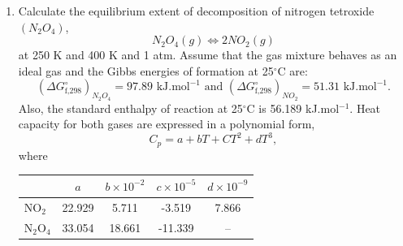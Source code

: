 \documentclass[12pts,a4paper,amsmath,amssymb,floatfix]{article}%
\newcounter{reaction}
\begin{document}
\begin{enumerate}[1)]
\clearpage


\item\label{Example:6} Calculate the equilibrium extent of decomposition of nitrogen tetroxide $\left(N_{2}O_{4}\right)$,
  \begin{displaymath}
     N_{2}O_{4} (g) \Longleftrightarrow 2 NO_{2} (g)
  \end{displaymath}
  at 250 K and 400 K and 1 atm. Assume that the gas mixture behaves as an ideal gas and the Gibbs energies of formation at 25$^{\circ}$C are:
  \begin{displaymath}
     \left(\Delta G^{\circ}_{\text{f,298}}\right)_{N_{2}O_{4}} = 97.89 \text{ kJ.mol}^{-1} \text{ and } \left(\Delta G^{\circ}_{\text{f,298}}\right)_{NO_{2}} = 51.31 \text{ kJ.mol}^{-1}.
  \end{displaymath}
  Also, the standard enthalpy of reaction at 25$^{\circ}$C is 56.189 kJ.mol$^{-1}$. Heat capacity for both gases are expressed in a polynomial form,
  \begin{displaymath}
    C_{p} = a + bT + CT^{2} + dT^{3},
  \end{displaymath}
  where
  \begin{center}
    \begin{tabular}{ l | c c c c }
      \hline
                          &  $a$     &  $b\times 10^{-2}$  & $c\times 10^{-5}$  & $d\times 10^{-9}$ \\
      \hline
      NO$_{2}$             &  22.929 &      5.711          & -3.519            & 7.866 \\
      N$_{2}$O$_{4}$       &   33.054 &      18.661         &    -11.339        &  -- 
    \end{tabular}
  \end{center}
      

\bigskip


\end{enumerate}
\end{document}
